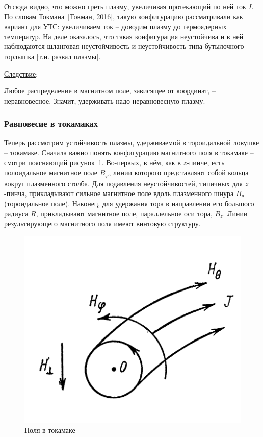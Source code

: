 \documentclass[10pt, a4paper]{article}
\newcommand{\Tokman}{~[Токман, 2016]}
\begin{document}
Отсюда видно, что можно греть плазму, увеличивая протекающий по ней ток $I$. По словам Токмана\Tokman, такую конфигурацию рассматривали как вариант для УТС: увеличиваем ток -- доводим плазму до термоядерных температур. На деле оказалось, что такая конфигурация неустойчива и в ней наблюдаются шланговая неустойчивость и неустойчивость типа бутылочного горлышка [т.н. \uline{развал плазмы}].

\uline{Следствие}:

Любое распределение в магнитном поле, зависящее от координат, -- неравновесное. Значит, удерживать надо неравновесную плазму.

\subsubsection{Равновесие в токамаках}

Теперь рассмотрим устойчивость плазмы, удерживаемой в тороидальной ловушке -- токамаке. Сначала важно понять конфигурацию магнитного поля в токамаке -- смотри поясняющий рисунок~\ref{fig:tokamak_fields}. Во-первых, в нём, как в $z$-пинче, есть полоидальное магнитное поле $B_\varphi$, линии которого представляют собой кольца вокруг плазменного столба. Для подавления неустойчивостей, типичных для $z$-пинча, прикладывают сильное магнитное поле вдоль плазменного шнура $B_\theta$ (тороидальное поле). Наконец, для удержания тора в направлении его большого радиуса $R$, прикладывают магнитное поле, параллельное оси тора, $B_z$. Линии результирующего магнитного поля имеют винтовую структуру.

\begin{figure}[ht]
	\begin{center}
		\includegraphics[width=0.5\linewidth]{6.tokamak_fields.png}
	\end{center}
    \caption{Поля в токамаке~\cite{arzimovich}}
    \label{fig:tokamak_fields} 
\end{figure}
\end{document}
